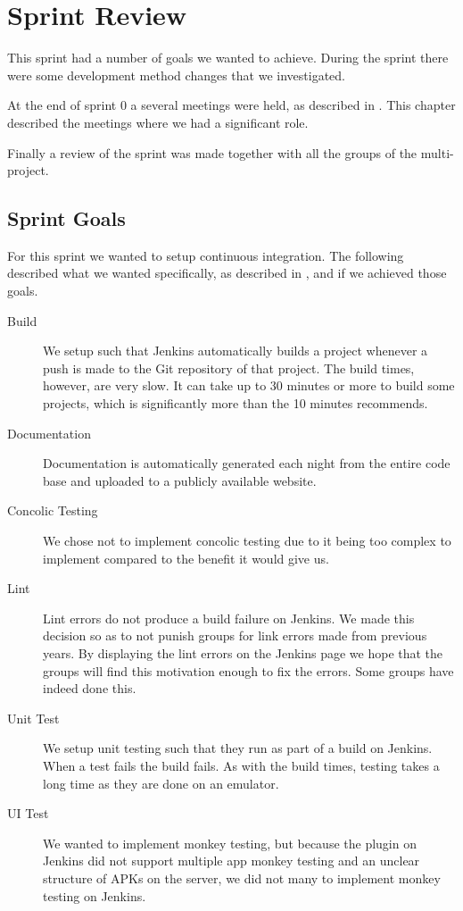 \chapter{Sprint Review}\label{chap:sprint1_end}
This sprint had a number of goals we wanted to achieve. During the sprint there were some development method changes that we investigated.

At the end of sprint 0 a several meetings were held, as described in . This chapter described the meetings where we had a significant role.

Finally a review of the sprint was made together with all the groups of the multi-project.

\section{Sprint Goals}
For this sprint we wanted to setup continuous integration. The following described what we wanted specifically, as described in , and if we achieved those goals.

\begin{description}
  \item[Build] We setup such that Jenkins automatically builds a project whenever a push is made to the Git repository of that project. The build times, however, are very slow. It can take up to 30 minutes or more to build some projects, which is significantly more than the 10 minutes \textcite{beck2004} recommends.
  \item[Documentation] Documentation is automatically generated each night from the entire code base and uploaded to a publicly available website.
  \item[Concolic Testing] We chose not to implement concolic testing due to it being too complex to implement compared to the benefit it would give us.
  \item[Lint] Lint errors do not produce a build failure on Jenkins. We made this decision so as to not punish groups for link errors made from previous years. By displaying the lint errors on the Jenkins page we hope that the groups will find this motivation enough to fix the errors. Some groups have indeed done this.
  \item[Unit Test] We setup unit testing such that they run as part of a build on Jenkins. When a test fails the build fails. As with the build times, testing takes a long time as they are done on an emulator.
  \item[UI Test] We wanted to implement monkey testing, but because the plugin on Jenkins did not support multiple app monkey testing and an unclear structure of APKs on the server, we did not many to implement monkey testing on Jenkins.
\end{description}

